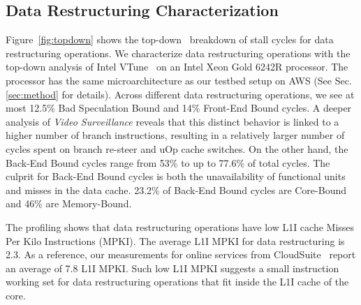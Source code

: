 \subsection{Data Restructuring Characterization}
%
%
Figure~\ref{fig:topdown} shows the top-down~\cite{top-down:ispass:2014} breakdown of stall cycles for data restructuring operations. 
%
We characterize data restructuring operations with the top-down analysis of Intel VTune~\cite{intel-vtune} on an Intel Xeon Gold 6242R processor. 
%
The processor has the same microarchitecture as our testbed setup on AWS (See Sec.\ref{sec:method} for details).
%
Across different data restructuring operations, we see at most 12.5\% Bad Speculation Bound and 14\% Front-End Bound cycles. A deeper analysis of \textit{Video Surveillance} reveals that this distinct behavior is linked to a higher number of branch instructions, resulting in a relatively larger number of cycles spent on branch re-steer and uOp cache switches. On the other hand, the Back-End Bound cycles range from 53\% to up to 77.6\% of total cycles. The culprit for Back-End Bound cycles is both the unavailability of functional units and misses in the data cache. 23.2\% of Back-End Bound cycles are Core-Bound and 46\% are Memory-Bound. %

The profiling shows that data restructuring operations have low L1I cache Misses Per Kilo Instructions (MPKI). The average L1I MPKI for data restructuring is 2.3. As a reference, our measurements for online services from CloudSuite~\cite{noauthor_cloudsuite_nodate} report an average of 7.8 L1I MPKI. 
Such low L1I MPKI suggests a small instruction working set for data restructuring operations that fit inside the L1I cache of the core. 

